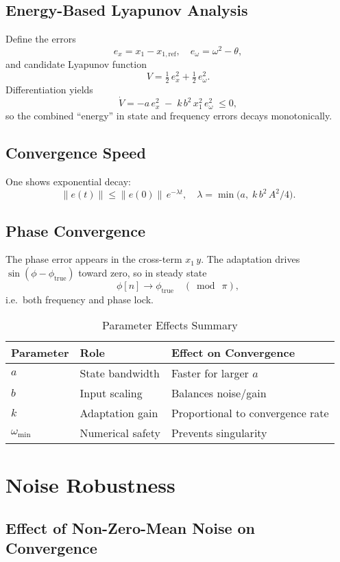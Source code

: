 \documentclass[12pt,letterpaper]{article}
\begin{document}
\subsection{Energy-Based Lyapunov Analysis}
Define the errors
\[
e_x = x_1 - x_{1,\mathrm{ref}}, 
\quad
e_\omega = \omega^2 - \theta,
\]
and candidate Lyapunov function
\[
V = \tfrac12\,e_x^2 + \tfrac12\,e_\omega^2.
\]
Differentiation yields
\[
\dot{V} = -a\,e_x^2 \;-\; k\,b^2\,x_1^2\,e_\omega^2 \;\le 0,
\]
so the combined “energy” in state and frequency errors decays monotonically.

\subsection{Convergence Speed}
One shows exponential decay:
\[
\|e(t)\|\le \|e(0)\|\,e^{-\lambda t},\quad
\lambda = \min\bigl(a,\;k\,b^2\,A^2/4\bigr).
\]

\subsection{Phase Convergence}
The phase error appears in the cross-term \(x_1\,y\).  The adaptation drives 
\(\sin(\phi-\phi_{\mathrm{true}})\) toward zero, so in steady state
\[
\phi[n]\to\phi_{\mathrm{true}}\quad (\bmod\ \pi),
\]
i.e.\ both frequency and phase lock.

\begin{table}[h]
\centering
\caption{Parameter Effects Summary}
\begin{tabular}{lll}
Parameter       & Role               & Effect on Convergence            \\
\hline
$a$              & State bandwidth    & Faster for larger \(a\)          \\
$b$              & Input scaling      & Balances noise/gain              \\
$k$              & Adaptation gain    & Proportional to convergence rate \\
$\omega_{\min}$ & Numerical safety   & Prevents singularity             \\
\end{tabular}
\end{table}

\section{Noise Robustness}

\subsection{Effect of Non-Zero-Mean Noise on Convergence}
\end{document}
